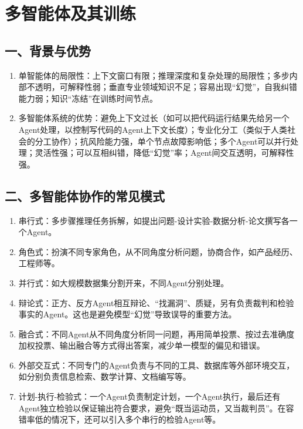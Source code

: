 \setcounter{section}{2}

\hypertarget{ux591aux667aux80fdux4f53ux53caux5176ux8badux7ec3}{%
\section{多智能体及其训练}\label{ux591aux667aux80fdux4f53ux53caux5176ux8badux7ec3}}

\hypertarget{ux4e00ux80ccux666fux4e0eux4f18ux52bf}{%
\subsection{一、背景与优势}\label{ux4e00ux80ccux666fux4e0eux4f18ux52bf}}

\begin{enumerate}
\def\labelenumi{\arabic{enumi}.}
\item
  单智能体的局限性：上下文窗口有限；推理深度和复杂处理的局限性；多步内部不透明，可解释性弱；垂直专业领域知识不足；容易出现``幻觉''，自我纠错能力弱；知识``冻结''在训练时间节点。
\item
  多智能体系统的优势：避免上下文过长（如可以把代码运行结果先给另一个Agent处理，以控制写代码的Agent上下文长度）；专业化分工（类似于人类社会的分工协作）；抗风险能力强，单个节点故障影响低；多个Agent可以并行处理；灵活性强；可以互相纠错，降低``幻觉''率；Agent间交互透明，可解释性强。
\end{enumerate}

\hypertarget{ux4e8cux591aux667aux80fdux4f53ux534fux4f5cux7684ux5e38ux89c1ux6a21ux5f0f}{%
\subsection{二、多智能体协作的常见模式}\label{ux4e8cux591aux667aux80fdux4f53ux534fux4f5cux7684ux5e38ux89c1ux6a21ux5f0f}}

\begin{enumerate}
\def\labelenumi{\arabic{enumi}.}
\item
  串行式：多步骤推理任务拆解，如提出问题-设计实验-数据分析-论文撰写各一个Agent。
\item
  角色式：扮演不同专家角色，从不同角度分析问题，协商合作，如产品经历、工程师等。
\item
  并行式：如大规模数据集分割开来，不同Agent分别处理。
\item
  辩论式：正方、反方Agent相互辩论、``找漏洞''、质疑，另有负责裁判和检验事实的Agent。这也是避免模型``幻觉''导致误导的重要方法。
\item
  融合式：不同Agent从不同角度分析同一问题，再用简单投票、按过去准确度加权投票、输出融合等方式得出答案，减少单一模型的偏见和错误。
\item
  外部交互式：不同专门的Agent负责与不同的工具、数据库等外部环境交互，如分别负责信息检索、数学计算、文档编写等。
\item
  计划-执行-检验式：一个Agent负责制定计划，一个Agent执行，最后还有Agent独立检验以保证输出符合要求，避免``既当运动员，又当裁判员''。在容错率低的情况下，还可以引入多个串行的检验Agent等。
\end{enumerate}

